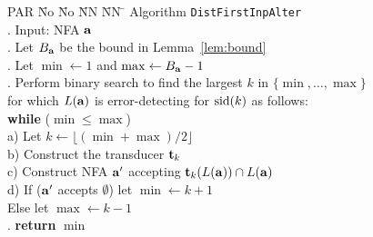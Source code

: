 \documentclass{article}
\theoremstyle{plain}
\theoremstyle{definition}
\theoremstyle{remark}
\newcommand\tsid{\trt_{k}}
\newcommand\db{B}             \newcommand\dbold{D}   \newcommand\pssi{\par\smallskip\indent}
\begin{document}
\begin{figure}[ht]
\begin{tabbing}
PAR \= No \= No \= NN \= NN \=\kill
\> Algorithm \texttt{DistFirstInpAlter} \\
.\> Input: NFA $\mathbf{a}$ \hspace{4mm} \\
.\> Let ${\db_\aut}$ be the bound in Lemma~\ref{lem:bound}\\
.\> Let $\min\leftarrow 1$ and $\max\leftarrow{\db_\aut}-1$ \\
.\> Perform binary search to find  the largest $k$ in
      $\{\min,\ldots,\max\}$ \\
\>  \> for which $L(\mathbf{a})$ is error-detecting for $\mathrm{sid}(k)$ as follows: \\
\>  \>  \textbf{while} ($\min\le \max$)\\
\>  \>  a)\> Let $k\leftarrow\lfloor(\min+\max)/2\rfloor$\\
\>   \> b)\> Construct the transducer $\tsid$ \\
\>   \> c)\> Construct NFA  $\mathbf{a}'$ accepting $\tsid(L(\aut))\cap L(\aut)$\\
\>   \> d)\> If ($\mathbf{a}'$ accepts $\emptyset$)  let $\min\leftarrow k+1$\\
\>   \> \>  Else  let $\max\leftarrow k-1$\\
. \> \textbf{return} $\min$
\end{tabbing}
\end{figure}
\end{document}
